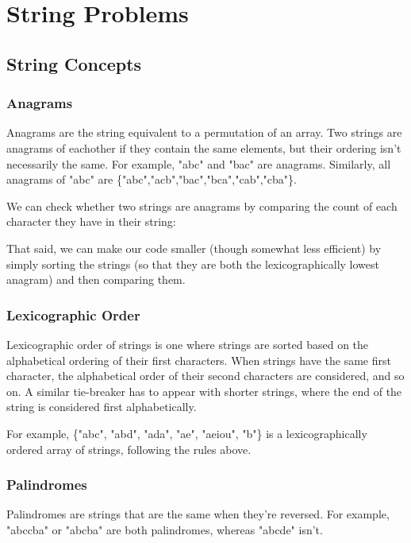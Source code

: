 \section{String Problems}
\subsection{String Concepts}

\subsubsection{Anagrams}

Anagrams are the string equivalent to a permutation of an array. Two strings are anagrams of eachother if they contain the same elements, but their ordering isn't necessarily the same. For example, "abc" and "bac" are anagrams. Similarly, all anagrams of "abc" are \{"abc","acb","bac","bca","cab","cba"\}.

We can check whether two strings are anagrams by comparing the count of each character they have in their string:


That said, we can make our code smaller (though somewhat less efficient) by simply sorting the strings (so that they are both the lexicographically lowest anagram) and then comparing them.


\subsubsection{Lexicographic Order}

Lexicographic order of strings is one where strings are sorted based on the alphabetical ordering of their first characters. When strings have the same first character, the alphabetical order of their second characters are considered, and so on. A similar tie-breaker has to appear with shorter strings, where the end of the string is considered first alphabetically.

For example, \{"abc", "abd", "ada", "ae", "aeiou", "b"\} is a lexicographically ordered array of strings, following the rules above.

\subsubsection{Palindromes}

Palindromes are strings that are the same when they're reversed. For example, "abccba" or "abcba" are both palindromes, whereas "abcde" isn't.

